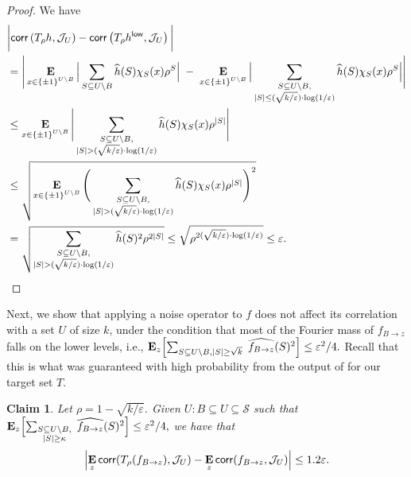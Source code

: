 \documentclass[10pt,a4paper]{article}
\theoremstyle{plain}
\newtheorem{claim}[theorem]{Claim}
\theoremstyle{remark}
\theoremstyle{plain}
\providecommand{\E}{}
\renewcommand{\E}{\mathop{\bf E\/}}
\newcommand{\bigbracket}[1]{\Bigl [ #1 \Bigr ]}
\newcommand{\eps}{\varepsilon}
\renewcommand{\hat}{\widehat}
\newcommand{\pmone}{\{\pm 1\}}
\newcommand{\calJ}{\mathcal{J}}
\newcommand{\calS}{\mathcal{S}}
\newcommand{\InfluentialCoords}{\calS}
\newcommand{\specialset}{T}
\newcommand{\corr}{\mathsf{corr}}
\newcommand{\low}{\mathsf{low}}
\newcommand{\fourierCutoff}{\kappa}
\renewcommand{\epsilon}{\varepsilon}
\begin{document}
\begin{proof}
We have
\begin{align*}
& \bigg|\corr\left(T_\rho h, \calJ_U\right) - \corr\left(T_\rho h^{\low}, \calJ_U\right)\bigg|\\
   &= \Bigg|\E_{\substack{x \in \pmone^{U \setminus B}}}
     \Big | \sum_{S \subseteq U\setminus B} \hat{h}(S)\chi_S(x)\rho^{S}\Big|
     \;-\;\E_{\substack{x \in \pmone^{U \setminus B}}}
     \Big |\sum_{\substack{S \subseteq U\setminus B,\\|S|\le (\sqrt{k/\eps}) \cdot \log(1/\eps)}} \hat{h}(S)\chi_S(x) \rho^{S}\Big|\Bigg|     \\
      &\le 
\E_{\substack{x \in \pmone^{U \setminus B}}}
     \Bigg |\sum_{\substack{S \subseteq U\setminus B,\\ |S|> (\sqrt{k/\eps}) \cdot \log(1/\eps)}} \hat{h}(S)\chi_S(x)\rho^{|S|} \Bigg|
     \\
     &\le \sqrt{\E_{\substack{x \in \pmone^{U \setminus B}}}
    \Bigg(\sum_{\substack{S \subseteq U\setminus B,\\|S|>(\sqrt{k/\eps}) \cdot \log(1/\eps)}} \hat{h}(S)\chi_S(x) \rho^{|S|}\Bigg)^2} \\
    &= \sqrt{\sum_{\substack{S\subseteq U\setminus B, \\ |S| > (\sqrt{k/\eps}) \cdot \log(1/\eps)}}\hat{h}(S)^2\rho^{2|S|}} 
    \le \sqrt{\rho^{2(\sqrt{k/\eps}) \cdot \log(1/\eps)}} 
    \le \eps.\qedhere
 \end{align*}
\end{proof}


Next, we show that applying a noise operator to $f$ does not affect its correlation with a set $U$ of size $k$, under the condition that most of the Fourier mass of $f_{B\to z}$ falls on the lower levels, i.e., $\E_z\bigbracket{\sum_{\substack{S \subseteq U \setminus B,  |S| \geq \sqrt{k}}} \;\hat{f_{B \to z}}(S)^2} \leq \epsilon^2/4.$ Recall that this is what was guaranteed with high probability from the output of  for our target set $\specialset$. 
\begin{claim}\label{claim:cor to cor noise}
Let $\rho = 1-\sqrt{k/\eps}$. 
 Given $U: B \subseteq U \subseteq \InfluentialCoords$ such that
 $\E_z\bigbracket{\sum_{\substack{S \subseteq U \setminus B,\\  |S| \geq \fourierCutoff}} \;\hat{f_{B \to z}}(S)^2} \leq \epsilon^2/4,$
we have that 
$$
\left |\E_z \corr(T_\rho (f_{B \to z}), \calJ_U) - \E_z \corr(f_{B \to z}, \calJ_U)\right| \leq 1.2 \eps.
$$
\end{claim}
 
\end{document}
